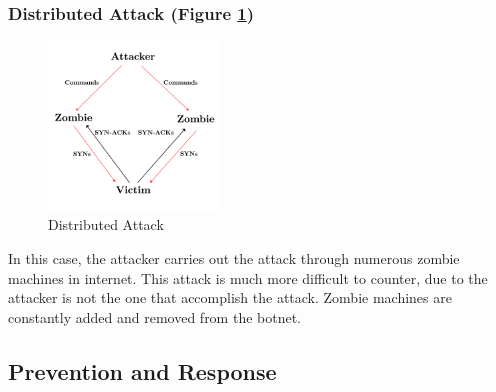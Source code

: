 \subsubsection{Distributed Attack (Figure \ref{fig:DistributedAttackSYN})}
\label{subsec:SYNDistributedAttack}

\begin{figure}[H]
\centering
\includegraphics[width=0.4\textwidth]{./images/DistributedAttackSYN.pdf}
\caption{Distributed Attack} \label{fig:DistributedAttackSYN}
\end{figure}

In this case, the attacker carries out the attack through numerous zombie machines in internet. This attack is much more difficult to counter, due to the attacker is not the one that accomplish the attack. Zombie machines are constantly added and removed from the botnet.


\subsection{Prevention and Response}
